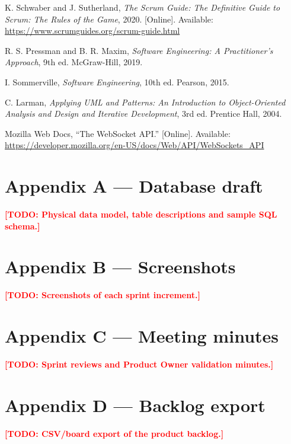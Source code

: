 \documentclass[12pt,a4paper]{report}
\newcommand{\todo}[1]{\textcolor{red}{\textbf{[TODO: #1]}}}
\begin{document}
\begin{enumerate}[label={[\arabic*]}]
    \item K. Schwaber and J. Sutherland, \emph{The Scrum Guide: The Definitive Guide to
          Scrum: The Rules of the Game}, 2020. [Online]. Available:
          \url{https://www.scrumguides.org/scrum-guide.html}
    \item R. S. Pressman and B. R. Maxim, \emph{Software Engineering: A Practitioner's
          Approach}, 9th ed. McGraw-Hill, 2019.
    \item I. Sommerville, \emph{Software Engineering}, 10th ed. Pearson, 2015.
    \item C. Larman, \emph{Applying UML and Patterns: An Introduction to Object-Oriented
          Analysis and Design and Iterative Development}, 3rd ed. Prentice Hall, 2004.
    \item Mozilla Web Docs, ``The WebSocket API.'' [Online]. Available:
          \url{https://developer.mozilla.org/en-US/docs/Web/API/WebSockets_API}
\end{enumerate}

\clearpage
\appendix
\chapter{Appendix A — Database draft}
\todo{Physical data model, table descriptions and sample SQL schema.}

\chapter{Appendix B — Screenshots}
\todo{Screenshots of each sprint increment.}

\chapter{Appendix C — Meeting minutes}
\todo{Sprint reviews and Product Owner validation minutes.}

\chapter{Appendix D — Backlog export}
\todo{CSV/board export of the product backlog.}

\end{document}
